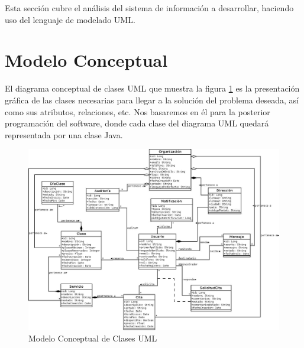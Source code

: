 


Esta sección cubre el análisis del sistema de información a desarrollar, haciendo uso del lenguaje de modelado UML.

\section{Modelo Conceptual} \label{sec:modelo-conceptual}

El diagrama conceptual de clases UML que muestra la figura \ref{fig:modelo-conceptual} es la presentación gráfica de las clases necesarias para llegar a la solución del problema deseada, así como sus atributos, relaciones, etc. Nos basaremos en él para la posterior programación del software, donde cada clase del diagrama UML quedará representada por una clase Java. 

\vspace{15mm}

\begin{figure}
\centering
  \includegraphics[scale=.35]{img/modelo-conceptual.jpeg}
  \caption{Modelo Conceptual de Clases UML}
  \label{fig:modelo-conceptual}
\end{figure}


